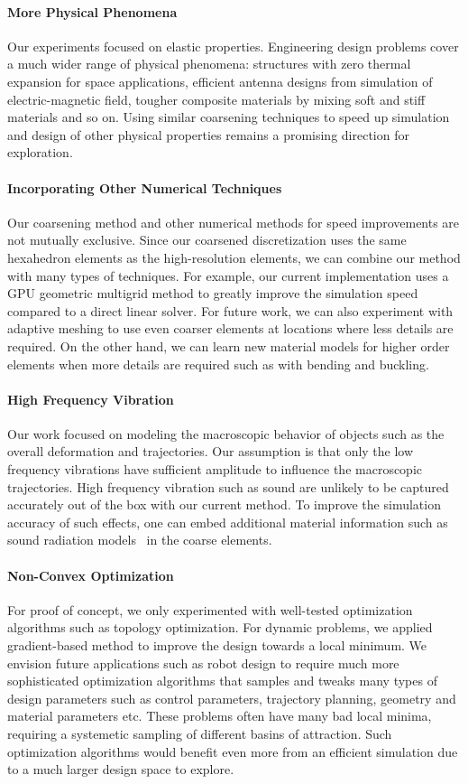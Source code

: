 \paragraph{More Physical Phenomena}
Our experiments focused on elastic properties.
Engineering design problems cover a much wider range of physical phenomena:
structures with zero thermal expansion for space applications, 
efficient antenna designs from simulation of electric-magnetic field, 
tougher composite materials by mixing soft and stiff materials and so on.
Using similar coarsening techniques to speed up simulation and design of 
other physical properties remains a promising direction for exploration.
\paragraph{Incorporating Other Numerical Techniques}
Our coarsening method and other numerical methods for speed improvements are not mutually exclusive.
Since our coarsened discretization uses the same hexahedron elements as the high-resolution elements, we can combine our method with many types of techniques.
For example, our current implementation uses a GPU geometric multigrid method to greatly improve the simulation speed compared to a direct linear solver.
For future work, we can also experiment with adaptive meshing to use even coarser elements at locations where less details are required.
On the other hand, we can learn new material models for higher order elements when more details are required such as with bending and buckling.
\paragraph{High Frequency Vibration}
Our work focused on modeling the macroscopic behavior of objects such as the overall deformation and trajectories.
Our assumption is that only the low frequency vibrations have sufficient amplitude to influence the macroscopic trajectories.
High frequency vibration such as sound are unlikely to be captured accurately out of the box with our current method.
To improve the simulation accuracy of such effects, one can embed additional material information such as sound radiation models~\citep{schweickart2017animating} in the coarse elements.
\paragraph{Non-Convex Optimization}
For proof of concept, we only experimented with well-tested optimization algorithms such as topology optimization.
For dynamic problems, we applied gradient-based method to improve the design towards a local minimum.
We envision future applications such as robot design to require much more sophisticated optimization algorithms 
that samples and tweaks many types of design parameters such as control parameters, trajectory planning, geometry and material parameters etc.
These problems often have many bad local minima, requiring a systemetic sampling of different basins of attraction.
Such optimization algorithms would benefit even more from an efficient simulation due to a much larger design space to explore.
